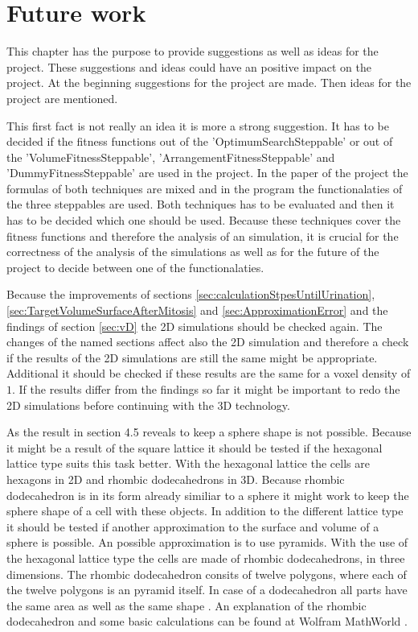 \chapter{Future work}
This chapter has the purpose to provide suggestions as well as ideas for the project. These suggestions and ideas could have an positive impact on the project. At the beginning suggestions for the project are made. Then ideas for the project are mentioned.


This first fact is not really an idea it is more a strong suggestion. It has to be decided if the fitness functions out of the 'OptimumSearchSteppable' or out of the 'VolumeFitnessSteppable', 'ArrangementFitnessSteppable' and 'DummyFitnessSteppable' are used in the project. In the paper of the project \cite{Torelli2017} the formulas of both techniques are mixed and in the program the functionalaties of the three steppables are used. Both techniques has to be evaluated and then it has to be decided which one should be used. Because these techniques cover the fitness functions and therefore the analysis of an simulation, it is crucial for the correctness of the analysis of the simulations as well as for the future of the project to decide between one of the functionalaties.

Because the improvements of sections \ref{sec:calculationStpesUntilUrination}, \ref{sec:TargetVolumeSurfaceAfterMitosis} and \ref{sec:ApproximationError} and the findings of section \ref{sec:vD} the 2D simulations should be checked again. The changes of the named sections affect also the 2D simulation and therefore a check if the results of the 2D simulations are still the same might be appropriate. Additional it should be checked if these results are the same for a voxel density of $1$. If the results differ from the findings so far it might be important to redo the 2D simulations before continuing with the 3D technology.


As the result in section 4.5 reveals to keep a sphere shape is not possible. Because it might be a result of the square lattice it should be tested if the hexagonal lattice type suits this task better. With the hexagonal lattice the cells are hexagons in 2D and rhombic dodecahedrons in 3D. Because rhombic dodecahedron is in its form already similiar to a sphere it might work to keep the sphere shape of a cell with these objects. \newline
In addition to the different lattice type it should be tested if another approximation to the surface and volume of a sphere is possible. An possible approximation is to use pyramids. With the use of the hexagonal lattice type the cells are made of rhombic dodecahedrons, in three dimensions. The rhombic dodecahedron consits of twelve polygons, where each of the twelve polygons is an pyramid itself. In case of a dodecahedron all parts have the same area as well as the same shape \cite{Horn1984}. An explanation of the rhombic dodecahedron and some basic calculations can be found at Wolfram MathWorld \cite{RhombicDodecahedron.html}.

